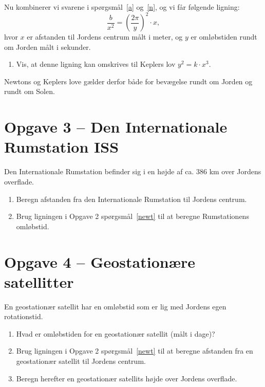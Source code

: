\documentclass[12pt,oneside,a4paper]{article}
\theoremstyle{plain}
\begin{document}
Nu kombinerer vi svarene i spørgsmål~\ref{a} og~\ref{n}, og vi får følgende ligning:
$$
\frac{b}{x^2} = \left(\frac{2\pi}{y}\right)^2 \cdot x,
$$
hvor $x$ er afstanden til Jordens centrum målt i meter, og $y$ er omløbstiden
rundt om Jorden målt i sekunder.
\begin{enumerate}[label=(\alph*) ,resume]
    \item Vis, at denne ligning kan omskrives til Keplers lov $y^2 = k\cdot x^3$. \label{newt}
\end{enumerate}

Newtons og Keplers love gælder derfor både for bevægelse rundt om Jorden og rundt om Solen.


\section*{Opgave 3 -- Den Internationale Rumstation ISS}
Den Internationale Rumstation befinder sig i en højde af ca. 386 km over Jordens overflade.
\begin{enumerate}[label=(\alph*)]
    \item Beregn afstanden fra den Internationale Rumstation til Jordens centrum.
    \item Brug ligningen i Opgave 2 spørgsmål~\ref{newt} til at beregne Rumstationens omløbstid.
\end{enumerate}


\section*{Opgave 4 -- Geostationære satellitter}
En geostationær satellit har en omløbstid som er lig med Jordens egen rotationstid.
\begin{enumerate}[label=(\alph*)]
    \item Hvad er omløbstiden for en geostationær satellit (målt i dage)?
    \item Brug ligningen i Opgave 2 spørgsmål~\ref{newt} til at beregne afstanden fra en geostationær
        satellit til Jordens centrum.
    \item Beregn herefter en geostationær satellits højde over Jordens overflade.
\end{enumerate}
\end{document}
